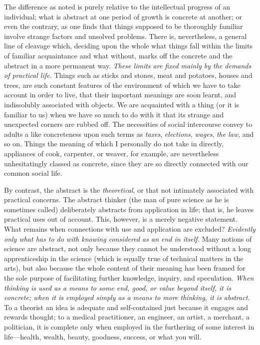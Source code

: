 \documentclass[letterpaper]{book}
\begin{document}

The difference as noted is purely relative to the intellectual progress
of an individual; what is
abstract
at one period of growth is concrete at another; or even the contrary, as
one finds that things supposed to be thoroughly familiar involve strange
factors and unsolved problems. There is, nevertheless, a general line of
cleavage which, deciding upon the whole what things fall within the
limits of familiar acquaintance and what without, marks off the concrete
and the abstract in a more permanent way. \emph{These limits are fixed
mainly by the demands of practical life.} Things such as sticks and
stones, meat and potatoes, houses and trees, are such constant features
of the environment of which we have to take account in order to live,
that their important meanings are soon learnt, and indissolubly
associated with objects. We are acquainted with a thing (or it is
familiar to us) when we have so much to do with it that its strange and
unexpected corners are rubbed off. The necessities of social intercourse
convey to adults a like concreteness upon such terms as \emph{taxes},
\emph{elections}, \emph{wages}, \emph{the law}, and so on. Things the
meaning of which I personally do not take in directly, appliances of
cook, carpenter, or weaver, for example, are nevertheless unhesitatingly
classed as concrete, since they are so directly connected with our
common social life.


By contrast, the abstract is the \emph{theoretical}, or that not
intimately associated with practical concerns. The abstract thinker (the
man of pure science as he is sometimes called) deliberately abstracts
from application in life; that is, he leaves practical uses out of
account. This, however, is a merely negative statement. What remains
when connections with use and application are excluded? \emph{Evidently
only what has to do with knowing considered as an end in itself.} Many
notions of
science
are abstract, not only because they cannot be understood without a long
apprenticeship in the science (which is equally true of technical
matters in the arts), but also because the whole content of their
meaning has been framed for the sole purpose of facilitating further
knowledge, inquiry, and speculation. \emph{When thinking is used as a
means to some end, good, or value beyond itself, it is concrete; when it
is employed simply as a means to more thinking, it is abstract.} To a
theorist an idea is adequate and self-contained just because it engages
and rewards thought; to a medical practitioner, an engineer, an artist,
a merchant, a politician, it is complete only when employed in the
furthering of some interest in life---health, wealth, beauty, goodness,
success, or what you will.
\end{document}
